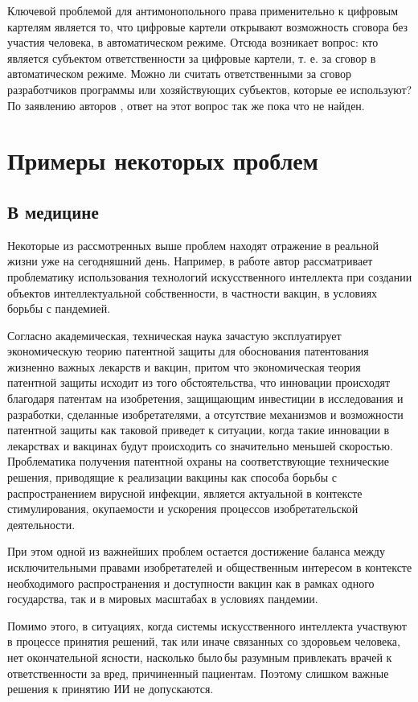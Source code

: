 Ключевой проблемой для антимонопольного права применительно к цифровым картелям является то,
что цифровые картели открывают возможность сговора без участия человека, в автоматическом режиме.
Отсюда возникает вопрос: кто является субъектом ответственности за цифровые картели, т. е. за сговор
в автоматическом режиме. Можно ли считать ответственными за сговор разработчиков программы или
хозяйствующих субъектов, которые ее используют? По заявлению авторов \cite{self}, ответ на этот вопрос
так же пока что не найден.
\newpage

\section{Примеры некоторых проблем}
\subsection{В медицине}
Некоторые из рассмотренных выше проблем находят отражение в реальной жизни
уже на сегодняшний день. Например,
в работе \cite{vac} автор рассматривает проблематику использования технологий искусственного
интеллекта при создании объектов интеллектуальной собственности, в частности вакцин, в условиях
борьбы с пандемией.

Согласно  \cite{vac} академическая, техническая наука зачастую эксплуатирует экономическую теорию патентной защиты для
обоснования патентования жизненно важных лекарств и вакцин, притом что экономическая теория патентной
защиты исходит из того обстоятельства, что инновации происходят благодаря патентам на изобретения,
защищающим инвестиции в исследования и разработки, сделанные изобретателями, а отсутствие механизмов
и возможности патентной защиты как таковой приведет к ситуации, когда такие инновации в лекарствах и
вакцинах будут происходить со значительно меньшей скоростью. Проблематика получения патентной охраны
на соответствующие технические решения, приводящие к реализации вакцины как способа борьбы с распространением
вирусной инфекции, является актуальной в контексте стимулирования, окупаемости и ускорения процессов
изобретательской деятельности.

При этом одной из важнейших проблем остается достижение баланса между исключительными правами изобретателей
и общественным интересом в контексте необходимого распространения и доступности вакцин как в рамках одного
государства, так и в мировых масштабах в условиях пандемии.

Помимо этого, в ситуациях, когда системы искусственного интеллекта участвуют в процессе принятия решений,
так или иначе связанных со здоровьем человека, нет окончательной ясности, насколько было бы разумным
привлекать врачей к ответственности за вред, причиненный пациентам. Поэтому слишком важные решения
к принятию ИИ не допускаются.

